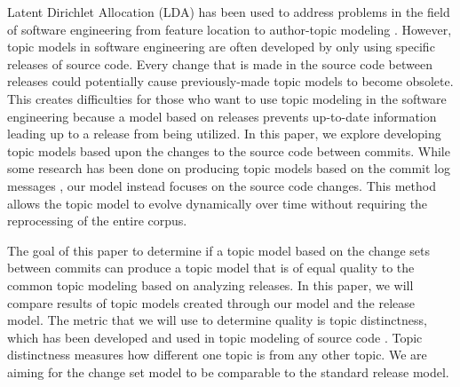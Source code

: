 
Latent Dirichlet Allocation (LDA) \cite{Blei2003} has been used to
address problems in the field of software engineering \cite{Binkley2014}
from feature location \cite{Bassett2013} to author-topic modeling \cite{Steyvers2004}.
However, topic models in software engineering are often developed by only using specific releases of source code.
Every change that is made in the source code between releases could potentially cause previously-made topic models to become obsolete.
This creates difficulties for those who want to use topic modeling in the software engineering
because a model based on releases prevents up-to-date information leading up to a release from being utilized.
In this paper, we explore developing topic models based upon the changes to the source code between commits.
While some research has been done on producing topic models based on the commit log messages \cite{Hindle2009},
our model instead focuses on the source code changes.
This method allows the topic model to evolve dynamically over time
without requiring the reprocessing of the entire corpus.

The goal of this paper to determine if a topic model based on the change sets between commits can produce a topic model that is of equal quality to the common topic modeling based on analyzing releases.
In this paper, we will compare results of topic models created through our model and the release model.
The metric that we will use to determine quality is topic distinctness, which has been developed and used in topic modeling of source code \cite{Thomas2011}.
Topic distinctness measures how different one topic is from any other topic.
We are aiming for the change set model to be comparable to the standard release model.


